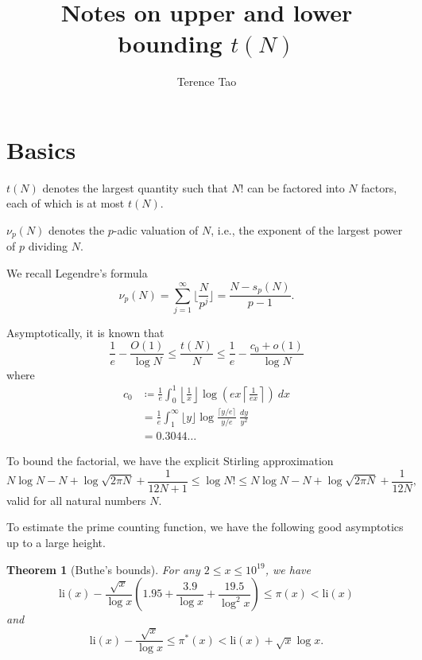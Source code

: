 \documentclass[12pt,a4paper,reqno]{amsart}
\numberwithin{equation}{section}
\theoremstyle{plain}
\newtheorem{theorem}{Theorem}[section]
\theoremstyle{definition}
\begin{document}
\title{Notes on upper and lower bounding $t(N)$}

\author{Terence Tao}
\maketitle


\section{Basics}

$t(N)$ denotes the largest quantity such that $N!$ can be factored into $N$ factors, each of which is at most $t(N)$.

$\nu_p(N)$ denotes the $p$-adic valuation of $N$, i.e., the exponent of the largest power of $p$ dividing $N$.

We recall Legendre's formula
\begin{equation}\label{legendre}
  \nu_p(N) = \sum_{j=1}^\infty \lfloor \frac{N}{p^j} \rfloor = \frac{N - s_p(N)}{p-1}.
\end{equation}

Asymptotically, it is known that
$$ \frac{1}{e} - \frac{O(1)}{\log N} \leq \frac{t(N)}{N} \leq \frac{1}{e} - \frac{c_0+o(1)}{\log N}$$
where
  \begin{align*}
    c_0 &\coloneqq \frac{1}{e} \int_0^1 \left \lfloor \frac{1}{x} \right\rfloor \log \left( ex \left \lceil \frac{1}{ex} \right\rceil \right)\ dx \\
    &= \frac{1}{e} \int_1^\infty \lfloor y \rfloor \log \frac{\lceil y/e \rceil}{y/e}\ \frac{dy}{y^2} \\
    &= 0.3044\dots
  \end{align*}

To bound the factorial, we have the explicit Stirling approximation \cite{robbins}
\begin{equation}\label{stirling}
  N \log N - N + \log \sqrt{2\pi N} + \frac{1}{12N+1} \leq \log N! \leq N \log N - N + \log \sqrt{2\pi N} + \frac{1}{12N},
\end{equation}
valid for all natural numbers $N$. 

To estimate the prime counting function, we have the following good asymptotics up to a large height.

  \begin{theorem}[Buthe's bounds]\cite{buthe}  For any $2 \leq x \leq 10^{19}$, we have
  $$ \mathrm{li}(x) - \frac{\sqrt{x}}{\log x}(1.95 + \frac{3.9}{\log x} + \frac{19.5}{\log^2 x}) \leq \pi(x) < \mathrm{li}(x)$$
  and
  $$ \mathrm{li}(x) - \frac{\sqrt{x}}{\log x} \leq \pi^*(x) < \mathrm{li}(x) + \sqrt{x}{\log x}.$$
  \end{theorem}
  
\end{document}
